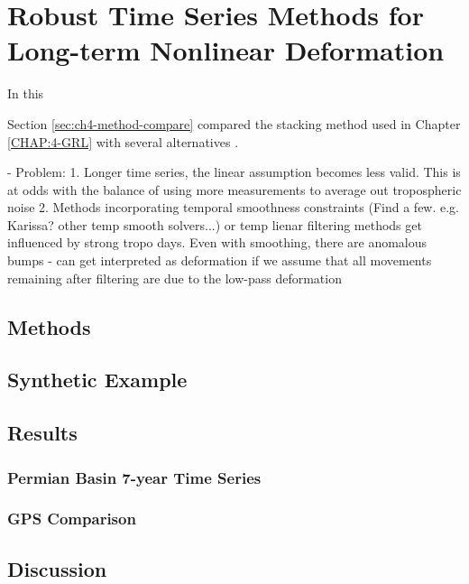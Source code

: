 


\chapter{Robust Time Series Methods for Long-term Nonlinear Deformation}
\label{CHAP:5-robust-ts}


In this 

Section \ref{sec:ch4-method-compare} compared the stacking method used in Chapter \ref{CHAP:4-GRL} with several alternatives .

- Problem: 
1. Longer time series, the linear assumption becomes less valid.  This is at odds with the balance of using more measurements to average out tropospheric noise
2. Methods incorporating temporal smoothness constraints (Find a few. e.g. Karissa? other temp smooth solvers...) or temp lienar filtering methods get influenced by strong tropo days. Even with smoothing, there are anomalous bumps 
	- can get interpreted as deformation if we assume that all movements remaining after filtering are due to the low-pass deformation
	

\section{Methods}

\section{Synthetic Example}

\section{Results}

\subsection{Permian Basin 7-year Time Series}

\subsection{GPS Comparison}

\section{Discussion}




